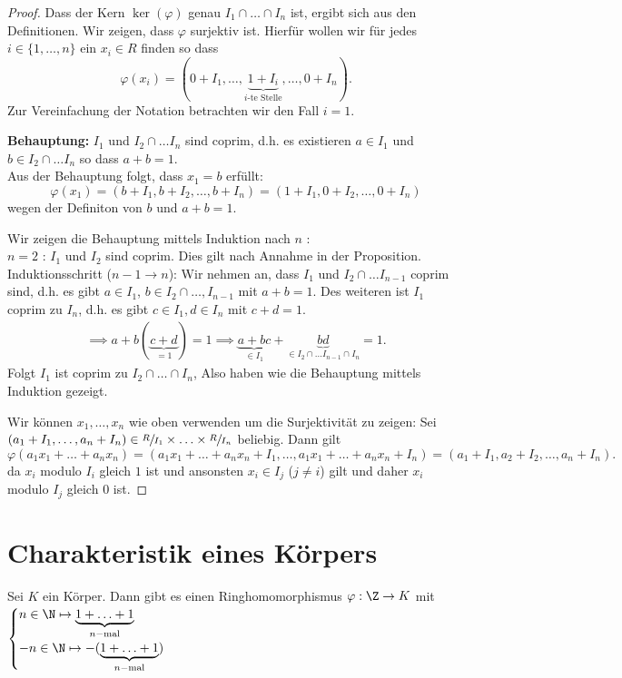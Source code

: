 \begin{proof}
	Dass der Kern $\ker(\varphi)$ genau $I_1 \cap \ldots \cap I_{n}$ ist, ergibt sich aus den Definitionen.
	Wir zeigen, dass $ \varphi$ surjektiv ist.
	Hierfür wollen wir für jedes $i \in \{1,\ldots,n\} $ ein $x_{i} \in R$ finden so dass
	\[
		\varphi(x_{i}) = (0+I_{1},\ldots,\underbrace{1+I_{i}}_{i\text{-te Stelle}},\ldots, 0+I_{n})
	.\] 
	Zur Vereinfachung der Notation betrachten wir den Fall $i = 1$.

	\textbf{Behauptung:} $I_1$ und $I_2 \cap \ldots I_{n}$ sind coprim, d.h. es existieren $a \in I_1$ und $b \in I_2 \cap \ldots I_{n}$ so dass $a+b = 1$.\\
	Aus der Behauptung folgt, dass $x_1 = b$ erfüllt:
	\[
		\varphi(x_1) = (b + I_1, b+I_2,\ldots,b+I_{n}) = (1+ I_1, 0 + I_2, \ldots, 0+I_{n})
	\] 
	wegen der Definiton von $b$ und $a + b = 1$.

	Wir zeigen die Behauptung mittels Induktion nach $n$ :\\
	$n=2$ : $I_1$ und $I_2$ sind coprim. Dies gilt nach Annahme in der Proposition.\\
	Induktionsschritt ($n-1 \to n$): Wir nehmen an, dass $I_1$ und $I_2 \cap \ldots I_{n-1}$ coprim sind, d.h. es gibt
	$a \in I_1$, $b \in I_2 \cap \ldots, I_{n-1}$ mit $a+b = 1$.
	Des weiteren ist $I_1$ coprim zu $I_{n}$, d.h. es gibt $c \in I_1, d \in I_{n}$ mit $c+d=1$.
	\begin{align*}
		\implies a+b (\underbrace{c+d}_{=1}) = 1 \implies \underbrace{a+bc}_{\in I_1} + \underbrace{bd}_{\in I_2 \cap \ldots I_{n-1} \cap I_{n}} = 1
	.\end{align*}
	Folgt $I_1$ ist coprim zu $I_2 \cap \ldots \cap I_{n}$,
	Also haben wie die Behauptung mittels Induktion gezeigt.

	Wir können $x_1,\ldots,x_{n}$ wie oben verwenden um die Surjektivität zu zeigen:
	Sei $(a_1 + I_1,\ldots,a_{n} + I_{n}) \in \sfrac{R}{I_1} \times \ldots \times \sfrac{R}{I_{n}}$ beliebig.
	Dann gilt
	\[
		\varphi(a_1 x_1 + \ldots + a_{n} x_{n}) = (a_1 x_1 + \ldots + a_{n} x_{n} + I_1, \ldots, a_1 x_1 + \ldots + a_{n} x_{n} + I_{n})
		= (a_1 + I_1, a_2 + I_2,\ldots,a_{n} + I_{n})
	.\] 
	da $x_i$ modulo $I_i$ gleich $1$ ist und ansonsten $x_{i} \in I_{j}$ ($j \neq i$) gilt und daher $x_{i}$ modulo $I_{j}$ gleich $0$ ist.
\end{proof}

\section{Charakteristik eines Körpers}
Sei $K$ ein Körper. Dann gibt es einen Ringhomomorphismus $ \varphi: \Z \to K$ mit $\begin{cases}
	n \in \N \mapsto \underbrace{1+\ldots+1}_{n-\text{mal}}\\
	-n \in \N \mapsto -(\underbrace{1+\ldots+1}_{n-\text{mal}})
\end{cases}$

